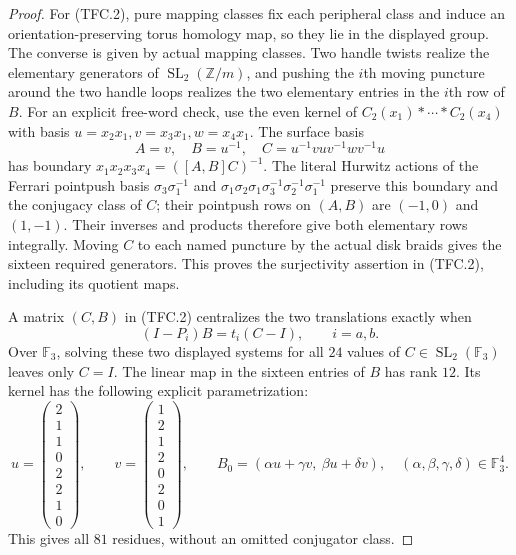 \begin{proof}
For (TFC.2), pure mapping classes fix each peripheral class and
induce an orientation-preserving torus homology map, so they lie
in the displayed group.  The converse is given by actual mapping
classes.  Two handle twists realize the elementary generators of
$\operatorname{SL}_2(\mathbb Z/m)$, and pushing the $i$th moving
puncture around the two handle loops realizes the two elementary
entries in the $i$th row of $B$.  For an explicit free-word check,
use the even kernel of $C_2(x_1)*\cdots*C_2(x_4)$ with basis
$u=x_2x_1,v=x_3x_1,w=x_4x_1$.  The surface basis
\[
 A=v,\quad B=u^{-1},\quad C=u^{-1}vuv^{-1}wv^{-1}u
\]
has boundary $x_1x_2x_3x_4=([A,B]C)^{-1}$.
The literal Hurwitz actions of the Ferrari pointpush basis
$\sigma_3\sigma_1^{-1}$ and
$\sigma_1\sigma_2\sigma_1\sigma_3^{-1}\sigma_2^{-1}\sigma_1^{-1}$
preserve this boundary and the conjugacy class of $C$; their
pointpush rows on $(A,B)$ are $(-1,0)$ and $(1,-1)$.
Their inverses and products therefore give both elementary rows
integrally.  Moving $C$ to each named puncture by the actual disk
braids gives the sixteen required generators.  This proves the
surjectivity assertion in (TFC.2), including its quotient maps.

A matrix $(C,B)$ in (TFC.2) centralizes the two translations exactly
when
\[
 (I-P_i)B=t_i(C-I),\qquad i=a,b.                         \tag{TFC.5}
\]
Over $\mathbb F_3$, solving these two displayed systems for all
$24$ values of $C\in\operatorname{SL}_2(\mathbb F_3)$ leaves only
$C=I$.  The linear map in the sixteen entries of $B$ has rank
$12$.  Its kernel has the following explicit parametrization:
\[
 u=\begin{pmatrix}2\\1\\1\\0\\2\\2\\1\\0\end{pmatrix},\qquad
 v=\begin{pmatrix}1\\2\\1\\2\\0\\2\\0\\1\end{pmatrix},\qquad
 B_0=(\alpha u+\gamma v,\ \beta u+\delta v),
 \quad(\alpha,\beta,\gamma,\delta)\in\mathbb F_3^4.
                                                               \tag{TFC.6}
\]
This gives all $81$ residues, without an omitted conjugator class.


\end{proof}

